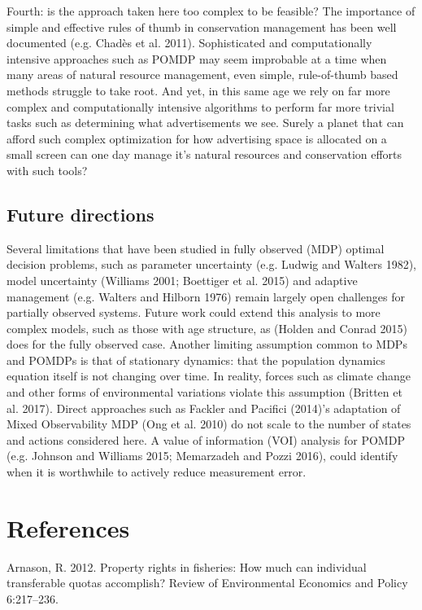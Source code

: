 \documentclass[3p]{elsarticle} %
\begin{document}
Fourth: is the approach taken here too complex to be feasible? The
importance of simple and effective rules of thumb in conservation
management has been well documented (e.g. Chadès et al. 2011).
Sophisticated and computationally intensive approaches such as POMDP may
seem improbable at a time when many areas of natural resource
management, even simple, rule-of-thumb based methods struggle to take
root. And yet, in this same age we rely on far more complex and
computationally intensive algorithms to perform far more trivial tasks
such as determining what advertisements we see. Surely a planet that can
afford such complex optimization for how advertising space is allocated
on a small screen can one day manage it's natural resources and
conservation efforts with such tools?

\subsection{Future directions}\label{future-directions}

Several limitations that have been studied in fully observed (MDP)
optimal decision problems, such as parameter uncertainty (e.g. Ludwig
and Walters 1982), model uncertainty (Williams 2001; Boettiger et al.
2015) and adaptive management (e.g. Walters and Hilborn 1976) remain
largely open challenges for partially observed systems. Future work
could extend this analysis to more complex models, such as those with
age structure, as (Holden and Conrad 2015) does for the fully observed
case. Another limiting assumption common to MDPs and POMDPs is that of
stationary dynamics: that the population dynamics equation itself is not
changing over time. In reality, forces such as climate change and other
forms of environmental variations violate this assumption (Britten et
al. 2017). Direct approaches such as Fackler and Pacifici (2014)'s
adaptation of Mixed Observability MDP (Ong et al. 2010) do not scale to
the number of states and actions considered here. A value of information
(VOI) analysis for POMDP (e.g. Johnson and Williams 2015; Memarzadeh and
Pozzi 2016), could identify when it is worthwhile to actively reduce
measurement error.

\section*{References}\label{references}

\hypertarget{refs}{}
\hypertarget{ref-Arnason2012}{}
Arnason, R. 2012. Property rights in fisheries: How much can individual
transferable quotas accomplish? Review of Environmental Economics and
Policy 6:217--236.
\end{document}
